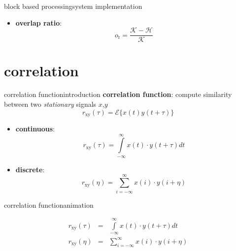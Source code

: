 \begin{frame}{block based processing}{system implementation}
{\begin{itemize}
\begin{eqnarray*}
                        i_{\mathrm{e}}(n)		&=& i_{\mathrm{s}}(n) + \mathcal{K} - 1
                    \end{eqnarray*}
                \item   \textbf{overlap ratio}:
                    \begin{equation*}
                        o_{\mathrm{r}}	= \frac {\mathcal{K}-\mathcal{H}}{\mathcal{K}}
                    \end{equation*}
            \end{itemize}}
            \vspace{50mm}
        \end{frame}	

    \section[correlation]{correlation}
        \begin{frame}{correlation function}{introduction}
            \textbf{correlation function}: compute similarity between two \textit{stationary} signals $x$,$y$
            \begin{equation*}
                r_\mathrm{xy}(\tau)=\mathcal{E}\lbrace x(t)y(t+\tau)\rbrace  
            \end{equation*}  
            
            \begin{itemize}
                \item<2->	\textbf{continuous}:
                    \begin{equation*}
                        r_\mathrm{xy}(\tau) = \int\limits_{-\infty}^{\infty}{x(t)\cdot y(t+\tau)dt}
                    \end{equation*}
                \item<2->	\textbf{discrete}:
                    \begin{equation*}
                        r_\mathrm{xy}(\eta) = \sum\limits_{i=-\infty}^{\infty}{x(i)\cdot y(i+\eta)}
                    \end{equation*}
            \end{itemize}
        \end{frame}	

        \begin{frame}{correlation function}{animation}
            \vspace{-5mm}
            \begin{footnotesize}
                    \begin{eqnarray*}
                        r_\mathrm{xy}(\tau) &=& \int\limits_{-\infty}^{\infty}{x(t)\cdot y(t+\tau)dt}\\
                        r_\mathrm{xy}(\eta) &=& \sum\limits_{i=-\infty}^{\infty}{x(i)\cdot y(i+\eta)}
                    \end{eqnarray*}
            \end{footnotesize}
        \end{frame}

